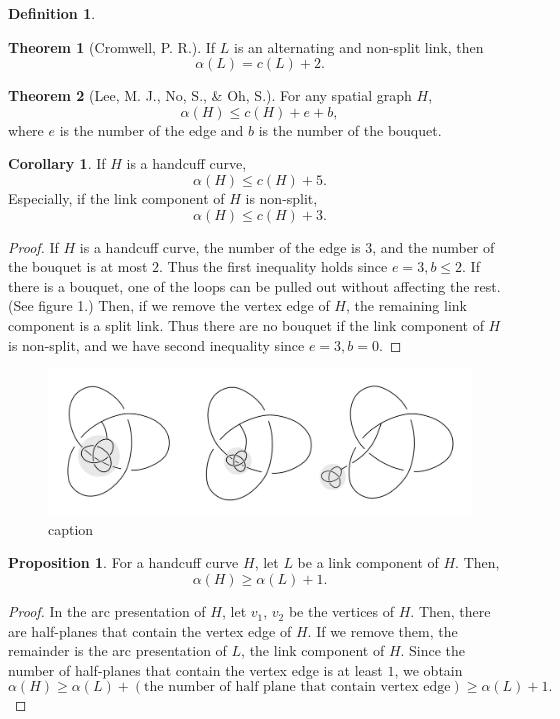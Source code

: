 \documentclass{article}
\theoremstyle{definition}
\newtheorem{defn}[thm]{Definition}
\theoremstyle{theorem}
\newtheorem{theorem}{Theorem}
\theoremstyle{proposition}
\newtheorem{prop}{Proposition}
\theoremstyle{corollary}
\newtheorem*{corol}{Corollary}
\begin{document}
\begin{defn}
\begin{theorem}[Cromwell, P. R.]
    If $L$ is an alternating and non-split link, then
    \[ \alpha(L) = c(L)+2. \]
\end{theorem}

\begin{theorem}[Lee, M. J., No, S., \& Oh, S.]
    For any spatial graph $H$,
    \[ \alpha(H) \leq c(H)+e+b, \]
    where $e$ is the number of the edge and $b$ is the number of the bouquet.
\end{theorem}

\begin{corol}
    If $H$ is a handcuff curve,
    \[ \alpha(H) \leq c(H)+5. \]
    Especially, if the link component of $H$ is non-split,
    \[ \alpha(H) \leq c(H)+3. \]
\end{corol}

\begin{proof}
    If $H$ is a handcuff curve, the number of the edge is $3$, and the number of the bouquet is at most $2$. Thus the first inequality holds since $e=3, b \leq 2$. If there is a bouquet, one of the loops can be pulled out without affecting the rest. (See figure 1.) Then, if we remove the vertex edge of $H$, the remaining link component is a split link. Thus there are no bouquet if the link component of $H$ is non-split, and we have second inequality since $e=3, b=0$.
\end{proof}

\begin{figure}
    \centerline{\includegraphics[width=\textwidth]{image.png}}
    \caption{caption}
    \label{figure_4} 
\end{figure}

\begin{prop}
    For a handcuff curve $H$, let $L$ be a link component of $H$. Then,
    \[ \alpha(H) \geq \alpha(L)+1. \]
\end{prop}
\begin{proof}
    In the arc presentation of $H$, let $v_1$, $v_2$ be the vertices of $H$. Then, there are half-planes that contain the vertex edge of $H$. If we remove them, the remainder is the arc presentation of $L$, the link component of $H$. Since the number of half-planes that contain the vertex edge is at least $1$, we obtain
    \[ \alpha(H) \geq \alpha(L) + (\text{the number of half plane that contain vertex edge}) \geq \alpha(L)+1. \]
\end{proof}


\end{defn}
\end{document}
